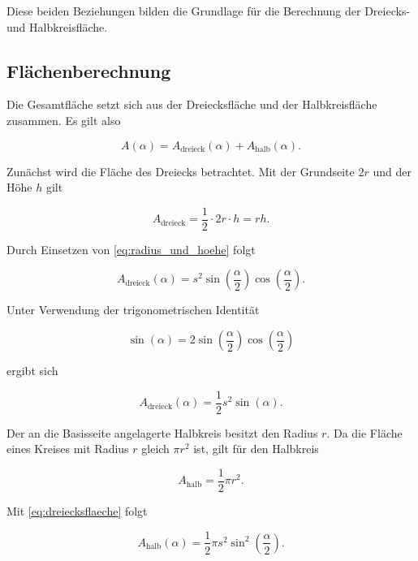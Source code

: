Diese beiden Beziehungen bilden die Grundlage für die Berechnung der
Dreiecks- und Halbkreisfläche.

\subsection{Flächenberechnung}

Die Gesamtfläche setzt sich aus der Dreiecksfläche und der Halbkreisfläche
zusammen. Es gilt also

\begin{equation}
    A(\alpha)
    =
    A_{\mathrm{dreieck}}(\alpha)
    +
    A_{\mathrm{halb}}(\alpha).
    \label{eq:gesamtflaeche_summe}
\end{equation}

Zunächst wird die Fläche des Dreiecks betrachtet. Mit der Grundseite
\(2r\) und der Höhe \(h\) gilt

\begin{equation}
    A_{\mathrm{dreieck}}
    =
    \frac{1}{2}\cdot 2r \cdot h
    =
    r h.
\end{equation}

Durch Einsetzen von \eqref{eq:radius_und_hoehe} folgt

\begin{equation}
    A_{\mathrm{dreieck}}(\alpha)
    =
    s^2
    \sin\left(\frac{\alpha}{2}\right)
    \cos\left(\frac{\alpha}{2}\right).
\end{equation}

Unter Verwendung der trigonometrischen Identität

\[
\sin(\alpha)
=
2\sin\left(\frac{\alpha}{2}\right)
 \cos\left(\frac{\alpha}{2}\right)
\]

ergibt sich

\begin{equation}
    A_{\mathrm{dreieck}}(\alpha)
    =
    \frac{1}{2}s^2\sin(\alpha).
    \label{eq:dreiecksflaeche}
\end{equation}

Der an die Basisseite angelagerte Halbkreis besitzt den Radius \(r\).
Da die Fläche eines Kreises mit Radius \(r\) gleich \(\pi r^2\) ist, gilt
für den Halbkreis

\begin{equation}
    A_{\mathrm{halb}}
    =
    \frac{1}{2}\pi r^2.
\end{equation}

Mit \eqref{eq:dreiecksflaeche} folgt

\begin{equation}
    A_{\mathrm{halb}}(\alpha)
    =
    \frac{1}{2}\pi s^2
    \sin^2\left(\frac{\alpha}{2}\right).
    \label{eq:halbkreisflaeche}
\end{equation}

